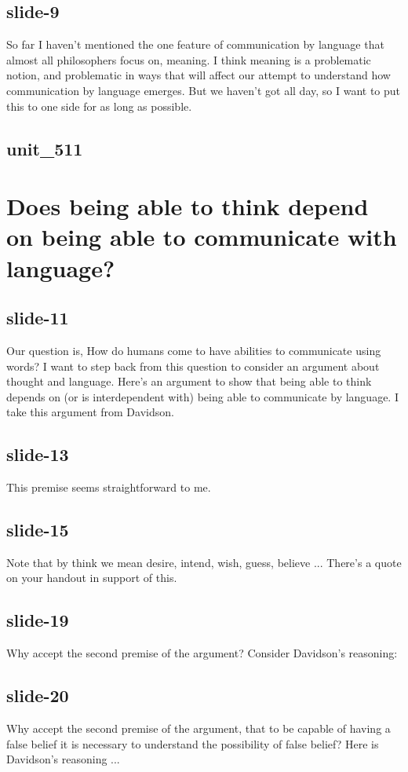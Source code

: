 \documentclass[12pt,\papersize]{extarticle}
\begin{document}
 
\subsection{slide-9}
So far I haven't mentioned the one feature of communication by language that almost all philosophers focus on, meaning.
I think meaning is a problematic notion, and problematic in ways that will affect our attempt to understand how communication by language emerges.
But we haven't got all day, so I want to put this to one side for as long as possible.
 
 
\subsection{unit\_511}
 
\section{Does being able to think depend on being able to communicate with language?}
 
 
\subsection{slide-11}
Our question is, How do humans come to have abilities to communicate using words?
I want to step back from this question to consider an argument about thought and language.
Here's an argument to show that being able to think depends on (or is interdependent with) being able to communicate by language.
I take this argument from Davidson.
 
 
\subsection{slide-13}
This premise seems straightforward to me.
 
 
\subsection{slide-15}
Note that by think we mean desire, intend, wish, guess, believe ...
There's a quote on your handout in support of this.
 
 
\subsection{slide-19}
Why accept the second premise of the argument? Consider Davidson's reasoning:
 
 
\subsection{slide-20}
Why accept the second premise of the argument, that to be capable of having a false belief it is necessary to understand the possibility of false belief?
Here is Davidson's reasoning ...
 
\end{document}

